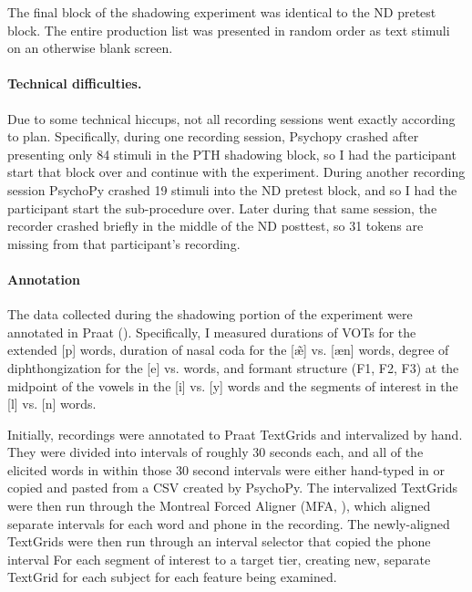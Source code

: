 The final block of the shadowing experiment was identical to the ND pretest block. The entire production list was presented in random order as text stimuli on an otherwise blank screen.

\paragraph{Technical difficulties.}
\label{para:shadowingTechDiffs}
Due to some technical hiccups, not all recording sessions went exactly according to plan. Specifically,
during one recording session, Psychopy crashed after presenting only 84 stimuli in the PTH shadowing block, so I had the participant start that block over and continue with the experiment. %
During another recording session PsychoPy crashed 19 stimuli into the ND pretest block, and so I had the participant start the sub-procedure over. Later during that same session, the recorder crashed briefly in the middle of the ND posttest, so 31 tokens are missing from that participant's recording.

\paragraph{Annotation}
\label{para:shadowingAnnotation}
The data collected during the shadowing portion of the experiment were annotated in Praat (\citep{praat}). Specifically, I measured durations of VOTs for the extended [p] words, duration of nasal coda %
for the [\~{\ae}] vs. [\ae n] words, degree of diphthongization for the [e] vs. \textipa{[iE]} words, and formant structure (F1, F2, F3) at the midpoint of the vowels in the [i] vs. [y] words and the segments of interest in the [l] vs. [n] words.

Initially, recordings were annotated to Praat TextGrids and intervalized by hand. They were divided into intervals of roughly 30 seconds each, and all of the elicited words in within those 30 second intervals were either hand-typed in or copied and pasted from a CSV created by PsychoPy. The intervalized TextGrids were then run through the Montreal Forced Aligner (MFA, \cite{mcauliffe2017montreal}), which aligned separate intervals for each word and phone in the recording. The newly-aligned TextGrids were then run through an interval selector that copied the phone interval For each segment of interest to a target tier, creating new, separate TextGrid for each subject for each feature being examined.


